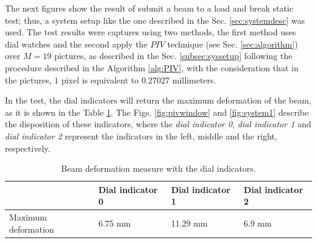 The next figures show the result of submit a beam to a load and break static test;
thus, a system setup like the one described in the Sec. \ref{sec:systemdesc} was used.
The test results were captures using two methods,
the first method uses dial watches and the second apply the $PIV$ technique (see Sec. \ref{sec:algorithm}) over 
$M=19$ pictures, as described in the Sec. \ref{subsec:syssetup} following the procedure described
in the Algorithm \ref{alg:PIV}, with the consideration that in the pictures, $1$ pixel is
equivalent to $0.27027$ millimeters.

In the test, the  dial indicators will return the maximum deformation of the beam,
as it is shown in the Table \ref{tab:watch}. The Figs. \ref{fig:pivwindow} and  \ref{fig:system1}
describe the disposition of these indicators, where  the \textit{dial indicator 0}, \textit{dial indicator 1} 
and \textit{dial indicator 2} represent the indicators in the left, middle and the right, respectively.

\begin{table}[h]
  \begin{tabular}{ p{} | p{} | p{} | p{}}
    \hline
    ~                  & Dial indicator 0 & Dial indicator 1 & Dial indicator 2 \\ \hline \hline
   Maximum deformation & 6.75 mm & 11.29 mm & 6.9 mm \\ \hline
    
  \end{tabular}
  \caption{Beam deformation measure with the dial indicators. }
  \label{tab:watch}
\end{table}

